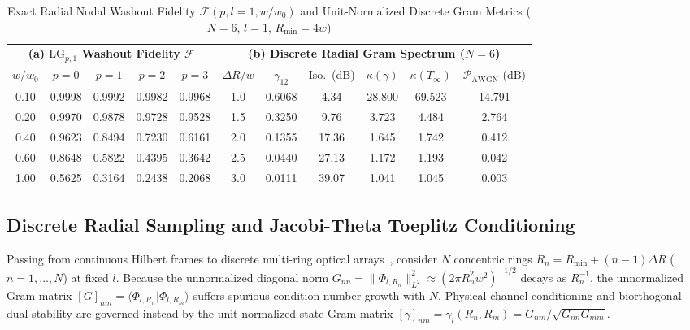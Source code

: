 \documentclass{optica-article}
\newcommand{\braket}[2]{\langle #1 | #2 \rangle}
\newcommand{\norm}[1]{\lVert #1 \rVert}
\begin{document}
\begin{table}[htbp]
  \centering
  \caption{Exact Radial Nodal Washout Fidelity $\mathcal{F}(p, l=1, w/w_0)$ and Unit-Normalized Discrete Gram Metrics ($N=6$, $l=1$, $R_{\min}=4w$)}
  \label{tab:fidelity}
  \scriptsize
  \renewcommand{\arraystretch}{1.14}
  \begin{tabular}{@{}ccccc@{\hspace{1.4em}}cccccc@{}}
  \toprule
  \multicolumn{5}{c}{\textbf{(a) $\mathrm{LG}_{p,1}$ Washout Fidelity $\mathcal{F}$}} & \multicolumn{6}{c}{\textbf{(b) Discrete Radial Gram Spectrum ($N=6$)}} \\
  \cmidrule(r){1-5}\cmidrule(l){6-11}
  $w/w_0$ & $p=0$ & $p=1$ & $p=2$ & $p=3$ & $\Delta R/w$ & $\gamma_{12}$ & Iso.\ (dB) & $\kappa(\gamma)$ & $\kappa(T_\infty)$ & $\mathcal{P}_{\mathrm{AWGN}}$ (dB) \\
  \midrule
  0.10 & 0.9998 & 0.9992 & 0.9982 & 0.9968 & 1.0 & 0.6068 & 4.34 & 28.800 & 69.523 & 14.791 \\
  0.20 & 0.9970 & 0.9878 & 0.9728 & 0.9528 & 1.5 & 0.3250 & 9.76 & 3.723 & 4.484 & 2.764 \\
  0.40 & 0.9623 & 0.8494 & 0.7230 & 0.6161 & 2.0 & 0.1355 & 17.36 & 1.645 & 1.742 & 0.412 \\
  0.60 & 0.8648 & 0.5822 & 0.4395 & 0.3642 & 2.5 & 0.0440 & 27.13 & 1.172 & 1.193 & 0.042 \\
  1.00 & 0.5625 & 0.3164 & 0.2438 & 0.2068 & 3.0 & 0.0111 & 39.07 & 1.041 & 1.045 & 0.003 \\
  \bottomrule
  \end{tabular}
\end{table}

\subsection{Discrete Radial Sampling and Jacobi-Theta Toeplitz Conditioning}

Passing from continuous Hilbert frames to discrete multi-ring optical arrays~\cite{Bownik2026}, consider $N$ concentric rings $R_n = R_{\min} + (n-1)\Delta R$ ($n=1,\dots,N$) at fixed $l$. Because the unnormalized diagonal norm $G_{nn} = \norm{\Phi_{l,R_n}}_{L^2}^2 \approx (2\pi R_n^2 w^2)^{-1/2}$ decays as $R_n^{-1}$, the unnormalized Gram matrix $[G]_{nm} = \braket{\Phi_{l,R_n}}{\Phi_{l,R_m}}$ suffers spurious condition-number growth with $N$. Physical channel conditioning and biorthogonal dual stability are governed instead by the unit-normalized state Gram matrix $[\gamma]_{nm} = \gamma_l(R_n,R_m) = G_{nm}/\sqrt{G_{nn}G_{mm}}$.
\end{document}
